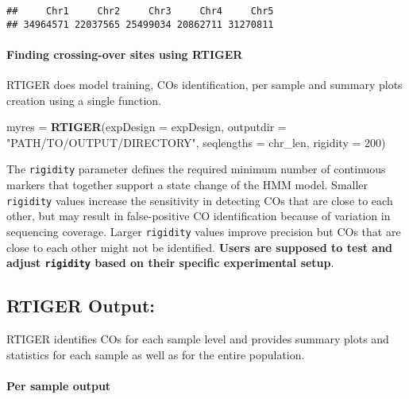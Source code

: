 \documentclass[]{article}
\newenvironment{Shaded}{\begin{snugshade}}{\end{snugshade}}
\newcommand{\DataTypeTok}[1]{\textcolor[rgb]{0.13,0.29,0.53}{#1}}
\newcommand{\DecValTok}[1]{\textcolor[rgb]{0.00,0.00,0.81}{#1}}
\newcommand{\KeywordTok}[1]{\textcolor[rgb]{0.13,0.29,0.53}{\textbf{#1}}}
\newcommand{\NormalTok}[1]{#1}
\newcommand{\StringTok}[1]{\textcolor[rgb]{0.31,0.60,0.02}{#1}}
\let\oldparagraph\paragraph
\renewcommand{\paragraph}[1]{\oldparagraph{#1}\mbox{}}
\begin{document}
\begin{verbatim}
##     Chr1     Chr2     Chr3     Chr4     Chr5 
## 34964571 22037565 25499034 20862711 31270811
\end{verbatim}

\hypertarget{finding-crossing-over-sites-using-rtiger}{%
\paragraph{Finding crossing-over sites using
RTIGER}\label{finding-crossing-over-sites-using-rtiger}}

RTIGER does model training, COs identification, per sample and summary
plots creation using a single function.

\begin{Shaded}
\begin{Highlighting}[]
\NormalTok{myres =}\StringTok{ }\KeywordTok{RTIGER}\NormalTok{(}\DataTypeTok{expDesign =}\NormalTok{ expDesign,}
               \DataTypeTok{outputdir =} \StringTok{"PATH/TO/OUTPUT/DIRECTORY"}\NormalTok{,}
               \DataTypeTok{seqlengths =}\NormalTok{ chr_len,}
               \DataTypeTok{rigidity =} \DecValTok{200}\NormalTok{)}
\end{Highlighting}
\end{Shaded}

The \texttt{rigidity} parameter defines the required minimum number of
continuous markers that together support a state change of the HMM
model. Smaller \texttt{rigidity} values increase the sensitivity in
detecting COs that are close to each other, but may result in
false-positive CO identification because of variation in sequencing
coverage. Larger \texttt{rigidity} values improve precision but COs that
are close to each other might not be identified. \textbf{Users are
supposed to test and adjust \texttt{rigidity} based on their specific
experimental setup}.\\

\hypertarget{rtiger-output}{%
\subsection{RTIGER Output:}\label{rtiger-output}}

RTIGER identifies COs for each sample level and provides summary plots
and statistics for each sample as well as for the entire population.

\hypertarget{per-sample-output}{%
\paragraph{Per sample output}\label{per-sample-output}}
\end{document}
